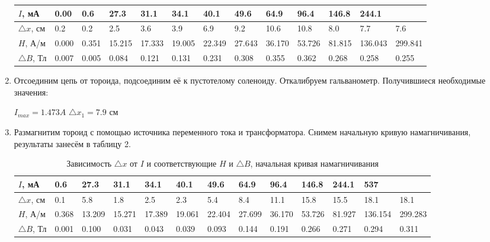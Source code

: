 \documentclass[a4paper]{article}
\begin{document}
\begin{enumerate}
\begin{table}[h]
\begin{tabular}{ |p{1.2cm}||p{1cm}|p{1cm}|p{1cm}|p{1cm}|p{1cm}|p{1cm}|p{1cm}|p{1cm}|p{1cm}|p{1cm}|p{1cm}|p{1cm}| }
    $I$, мА & 0.00 & 0.6 & 27.3 & 31.1 & 34.1 & 40.1 & 49.6 & 64.9 & 96.4 & 146.8 & 244.1 \\
\hline
    $\triangle x$, см & 0.2 & 0.2 & 2.5 & 3.6 & 3.9 & 6.9 & 9.2 & 10.6 & 10.8 & 8.0 & 7.7 & 7.6 \\
\hline
    $H$, А/м & 0.000 & 0.351 & 15.215 & 17.333 & 19.005 & 22.349 & 27.643 & 36.170 & 53.726 & 81.815 & 136.043 & 299.841 \\
\hline
    $\triangle B$, Тл & 0.007 & 0.005 & 0.084 & 0.121 & 0.131 & 0.231 & 0.308 & 0.355 & 0.362 & 0.268 & 0.258 & 0.255 \\
\hline
\hline
    \end{tabular}
\end{table}
    
\item Отсоединим цепь от тороида, подсоединим её к пустотелому соленоиду. Откалибруем гальванометр. Получившиеся необходимые значения:

\begin{center}
    $I_{max}  = 1.473 A$ \hspace{1cm} $\triangle x_{1} = 7.9$ см
\end{center}

\item Размагнитим тороид с помощью источника переменного тока и трансформатора. Снимем начальную кривую намагничивания, результаты занесём в таблицу 2.

   \begin{table}[h]
    \centering
    \begin{center}
    \caption{Зависимость $\triangle x$ от $I$ и соответствующие $H$ и $\triangle B$, начальная кривая намагничивания}
    \end{center}
    \vspace{0.1cm}
    \label{tab:my_label}
    \begin{tabular}{ |p{1.2cm}||p{1cm}|p{1cm}|p{1cm}|p{1cm}|p{1cm}|p{1cm}|p{1cm}|p{1cm}|p{1cm}|p{1cm}|p{1cm}|p{1cm}| }
 \hline
    $I$, мА & 0.6 & 27.3 & 31.1 & 34.1 & 40.1 & 49.6 & 64.9 & 96.4 & 146.8 & 244.1 & 537 \\
\hline
    $\triangle x$, см & 0.1 & 5.8 & 1.8 & 2.5 & 2.3 & 5.4 & 8.4 & 11.1 & 15.8 & 15.5 & 18.1 & 18.1 \\
\hline
    $H$, А/м & 0.368 & 13.209 & 15.271 & 17.389 & 19.061 & 22.404 & 27.699 & 36.170 & 53.726 & 81.927 & 136.154 & 299.283\\
\hline
    $\triangle B$, Тл & 0.001 & 0.100 & 0.031 & 0.043 & 0.039 & 0.093 & 0.144 & 0.191 & 0.266 & 0.271 & 0.294 & 0.311\\
\hline
\hline


\end{tabular}
\end{table}
\end{enumerate}
\end{document}
